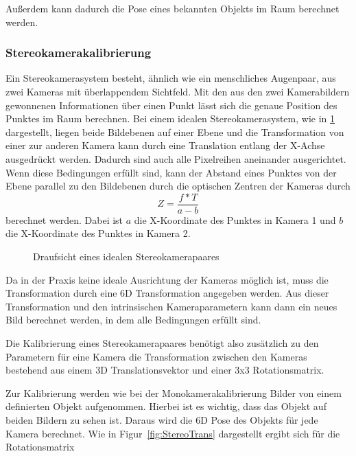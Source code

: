 Außerdem kann dadurch die Pose eines bekannten Objekts im Raum berechnet
werden. 


\subsubsection{Stereokamerakalibrierung} %
\label{sssec:Stereokamerakalibrierung} Ein Stereokamerasystem besteht, ähnlich
wie ein menschliches Augenpaar, aus zwei Kameras mit überlappendem Sichtfeld.
Mit den aus den zwei Kamerabildern gewonnenen Informationen über einen Punkt
lässt sich die genaue Position des Punktes im Raum berechnen. Bei einem idealen
Stereokamerasystem, wie in \ref{fig:DraufStereo} dargestellt, liegen beide
Bildebenen auf einer Ebene und die Transformation von einer zur anderen Kamera
kann durch eine Translation entlang der X-Achse ausgedrückt werden. Dadurch
sind auch alle Pixelreihen aneinander ausgerichtet. Wenn diese Bedingungen erfüllt sind, kann der Abstand
eines Punktes von der Ebene parallel zu den Bildebenen durch die optischen
Zentren der Kameras durch \begin{equation} Z=\frac{f*T}{a-b} \end{equation}
berechnet werden. Dabei ist $a$ die X-Koordinate des Punktes in Kamera 1 und 
$b$ die X-Koordinate des Punktes in Kamera 2.


\begin{figure}[htpb] \centering \def\svgwidth{\textwidth}
   \caption{Draufsicht eines idealen
  Stereokamerapaares} \label{fig:DraufStereo} \end{figure}

Da in der Praxis keine ideale Ausrichtung der Kameras möglich ist, muss die
Transformation durch eine 6D Transformation angegeben werden. Aus dieser
Transformation und den intrinsischen Kameraparametern kann dann ein neues Bild
berechnet werden, in dem alle Bedingungen erfüllt sind.

Die Kalibrierung eines Stereokamerapaares benötigt also zusätzlich zu den
Parametern für eine Kamera die Transformation zwischen den Kameras bestehend
aus einem 3D Translationsvektor und einer 3x3 Rotationsmatrix.

Zur Kalibrierung werden wie bei der Monokamerakalibrierung Bilder von einem
definierten Objekt aufgenommen. Hierbei ist es wichtig, dass das Objekt auf
beiden Bildern zu sehen ist. Daraus wird die 6D Pose des Objekts für jede
Kamera berechnet. Wie in Figur~\ref{fig:StereoTrans} dargestellt ergibt sich
für die Rotationsmatrix

